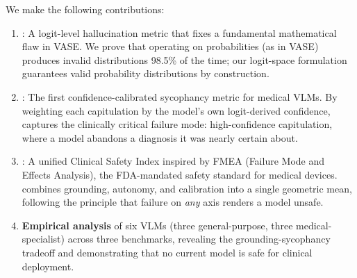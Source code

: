 We make the following contributions:
\begin{enumerate}[leftmargin=*,itemsep=2pt,topsep=2pt]
    \item \textbf{\lvase{}}: A logit-level hallucination metric that fixes a fundamental mathematical flaw in VASE. We prove that operating on probabilities (as in VASE) produces invalid distributions 98.5\% of the time; our logit-space formulation guarantees valid probability distributions by construction.

    \item \textbf{\ccs{}}: The first confidence-calibrated sycophancy metric for medical VLMs. By weighting each capitulation by the model's own logit-derived confidence, \ccs{} captures the clinically critical failure mode: high-confidence capitulation, where a model abandons a diagnosis it was nearly certain about.

    \item \textbf{\csi{}}: A unified Clinical Safety Index inspired by FMEA (Failure Mode and Effects Analysis), the FDA-mandated safety standard for medical devices. \csi{} combines grounding, autonomy, and calibration into a single geometric mean, following the principle that failure on \emph{any} axis renders a model unsafe.

    \item \textbf{Empirical analysis} of six VLMs (three general-purpose, three medical-specialist) across three benchmarks, revealing the grounding-sycophancy tradeoff and demonstrating that no current model is safe for clinical deployment.
\end{enumerate}
